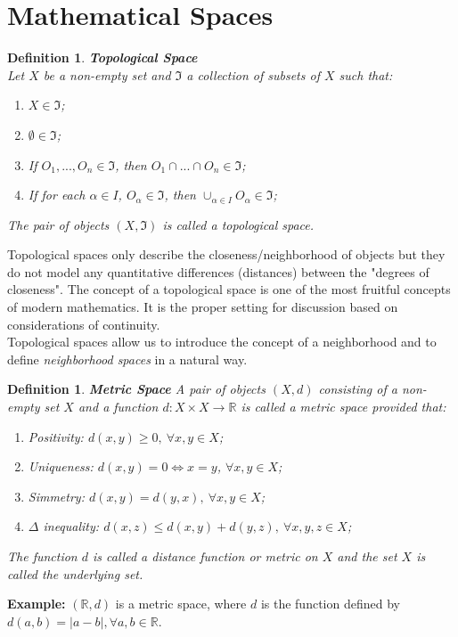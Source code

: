 \documentclass[twoside]{article}
\newtheorem{definition}[theorem]{Definition}
\begin{document}
\section{Mathematical Spaces}
\begin{definition} \textbf{Topological Space} \\
Let $X$ be a non-empty set and $\Im$ a collection of subsets of $X$ such that:
\renewcommand{\theenumi}{\Roman{enumi}}
\begin{enumerate}
    \item $X \in \Im$;
    \item $\emptyset \in \Im$;
    \item If $O_1,...,O_n \in \Im$, then $O_1 \cap... \cap O_n \in \Im$;
    \item If for each $\alpha \in I$, $O_\alpha \in \Im$, then $\cup_{\alpha \in I} O_\alpha \in \Im$;
\end{enumerate}
The pair of objects $(X, \Im)$ is called a topological space.
\end{definition}
Topological spaces only describe the closeness/neighborhood of objects but they do not model any quantitative differences (distances) between the "degrees of closeness". The concept of a topological space is one of the most fruitful concepts of modern mathematics. It is the proper setting for discussion based on considerations of continuity.\\
Topological spaces allow us to introduce the concept of a neighborhood and to define \textit{neighborhood spaces} in a natural way.
\begin{definition} \textbf{Metric Space}
A pair of objects $(X, d)$ consisting of a non-empty set $X$ and a function $d: X \times X \rightarrow \mathbb{R}$ is called a metric space provided that:
\renewcommand{\theenumi}{\Roman{enumi}}
\begin{enumerate}
    \item Positivity: $d(x,y) \geq 0, \: \forall x, y \in X$;
    \item Uniqueness: $d(x,y) = 0 \Leftrightarrow x = y$, \: $\forall x,y \in X$;
    \item Simmetry: $d(x,y) = d(y,x), \: \forall x, y \in X$;
    \item $\Delta$ inequality: $d(x,z) \leq d(x,y) + d(y,z), \: \forall x, y, z \in X$;
\end{enumerate}
The function $d$ is called a distance function or metric on $X$ and the set $X$ is called the underlying set.
\end{definition}
\textbf{Example:} $(\mathbb{R}, d)$ is a metric space, where $d$ is the function defined by $d(a,b) = |a-b|, \forall a,b \in \mathbb{R}$.
\end{document}
